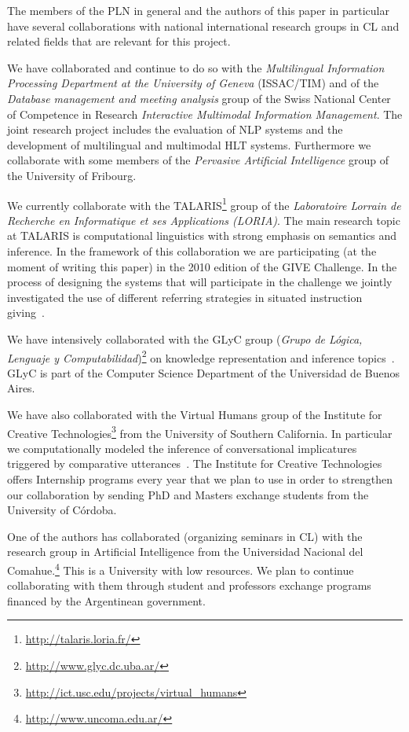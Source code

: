 The members of the PLN in general and the authors of this paper in particular
have several collaborations with national international research groups in CL
and related fields that are relevant for this project. 
 
We have collaborated and continue to do so with the \textit{Multilingual
Information
Processing Department at the University of Geneva} (ISSAC/TIM) and of the
\emph{Database management
and meeting
analysis} group of the Swiss National Center of Competence in Research  
\emph{Interactive Multimodal Information Management}. The joint research
project includes the evaluation of NLP systems and the
development of multilingual and multimodal HLT systems. Furthermore we
collaborate with some members of the \textit{Pervasive Artificial
Intelligence} group of the University of Fribourg. 

We currently collaborate with
the TALARIS\footnote{\url{http://talaris.loria.fr/}}
group of the \emph{Laboratoire Lorrain de Recherche en Informatique et ses
Applications (LORIA)}. The main research topic at TALARIS is computational
linguistics
with strong emphasis on semantics and inference. In the framework of this
collaboration we are participating
(at the moment of writing this paper) in the 2010 edition of the GIVE
Challenge. In the process of designing the systems that will participate in
the challenge we jointly investigated the use of different referring strategies
in situated instruction
giving~\cite{amoia10}. 

We have intensively collaborated with the GLyC group (\textit{Grupo de L\'ogica,
Lenguaje y Computabilidad})\footnote{\url{http://www.glyc.dc.uba.ar/}} on
knowledge representation and inference topics~\cite{AG06,AFFM08}. GLyC is part
of the Computer Science Department of the Universidad de Buenos Aires. 

We have also collaborated with the Virtual Humans group of the Institute for
Creative Technologies\footnote{\url{http://ict.usc.edu/projects/virtual_humans}}
from the University of Southern California. In particular we computationally
modeled the inference of conversational implicatures triggered by comparative
utterances~\cite{benotti09a}. The Institute for Creative Technologies offers
Internship programs every year that we plan to use in order to strengthen our
collaboration by sending PhD and Masters exchange students from the University
of C\'ordoba.

One of the authors has collaborated (organizing seminars in CL) with the
research group in Artificial Intelligence from the Universidad Nacional del
Comahue.\footnote{\url{http://www.uncoma.edu.ar/}} This is a University with
low resources. We plan to continue collaborating with them through student and
professors exchange programs financed by the Argentinean government. 

